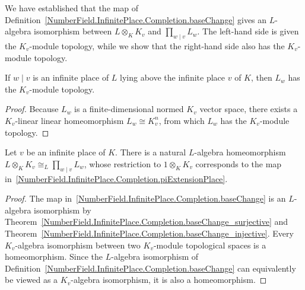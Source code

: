 We have established that the map of
Definition~\ref{NumberField.InfinitePlace.Completion.baseChange} gives an $L$-algebra isomorphism
between $L\otimes_K K_v$ and $\prod_{w\mid v}L_w$.
The left-hand side is given the $K_v$-module topology, while we show that the right-hand side also
has the $K_v$-module topology.
\begin{theorem}
  \label{NumberField.InfinitePlace.Completion.instIsModuleTopologyValEqComapAlgebraMap_fLT}
  \leanok
  If $w \mid v$ is an infinite place of $L$ lying above the infinite place $v$ of $K$, then
  $L_w$ has the $K_v$-module topology.
\end{theorem}
\begin{proof}
  Because $L_w$ is a finite-dimensional normed $K_v$ vector space, there exists a $K_v$-linear
  linear homeomorphism $L_w \cong K_v^n$, from which $L_w$ has the $K_v$-module topology.
\end{proof}

\begin{theorem}
  \label{NumberField.InfinitePlace.Completion.baseChangeEquiv}
  \leanok
  Let $v$ be an infinite place of $K$. There is a natural $L$-algebra homeomorphism
  $L\otimes_K K_v \cong_L \prod_{w\mid v}L_w$, whose restriction to $1\otimes_K K_v$ corresponds to
  the map in~\ref{NumberField.InfinitePlace.Completion.piExtensionPlace}.
\end{theorem}
\begin{proof}
  The map in~\ref{NumberField.InfinitePlace.Completion.baseChange} is an $L$-algebra
  isomorphism by Theorem~\ref{NumberField.InfinitePlace.Completion.baseChange_surjective}
  and Theorem~\ref{NumberField.InfinitePlace.Completion.baseChange_injective}.
  Every $K_v$-algebra isomorphism between two $K_v$-module topological spaces is a homeomorphism.
  Since the $L$-algebra isomorphism of
  Definition~\ref{NumberField.InfinitePlace.Completion.baseChange} can equivalently be viewed as
  a $K_v$-algebra isomorphism, it is also a homeomorphism.
\end{proof}

